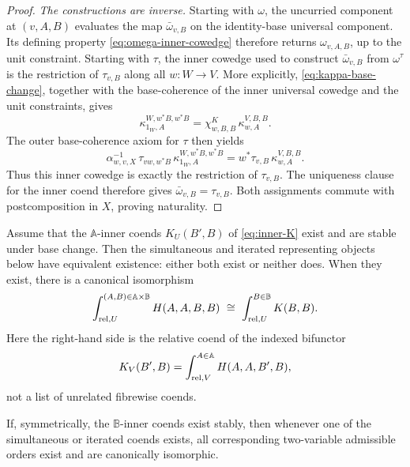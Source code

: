 \begin{proof}
\emph{The constructions are inverse.}
Starting with \(\omega\), the uncurried component at \((v,A,B)\) evaluates
the map \(\bar\omega_{v,B}\) on the identity-base universal component.
Its defining property \cref{eq:omega-inner-cowedge} therefore returns
\(\omega_{v,A,B}\), up to the unit constraint.  Starting with \(\tau\), the
inner cowedge used to construct \(\bar\omega_{v,B}\) from
\(\omega^\tau\) is the restriction of \(\tau_{v,B}\) along all
\(w:W\to V\).  More explicitly, \cref{eq:kappa-base-change}, together
with the base-coherence of the inner universal cowedge and the unit
constraints, gives
\begin{equation}
  \kappa^{W,w^*B,w^*B}_{1_W,A}
  =
  \chi^K_{w,B,B}\,
  \kappa^{V,B,B}_{w,A}.
  \label{eq:kappa-identity-restriction}
\end{equation}
The outer base-coherence axiom for \(\tau\) then yields
\begin{equation}
 \alpha^{-1}_{w,v,X}\,
 \tau_{vw,w^*B}\,
 \kappa^{W,w^*B,w^*B}_{1_W,A}
 =
 w^*\tau_{v,B}\,
 \kappa^{V,B,B}_{w,A}.
 \label{eq:tau-restricted-inner}
\end{equation}
Thus this inner cowedge is exactly the restriction of \(\tau_{v,B}\).
The uniqueness clause for the inner coend therefore gives
\(\bar\omega_{v,B}=\tau_{v,B}\).  Both assignments commute with
postcomposition in \(X\), proving naturality.
\end{proof}

\begin{theorem}
\label{thm:relative-fubini}
Assume that the \(\mathbb A\)-inner coends
\(K_U(B',B)\) of \cref{eq:inner-K} exist and are stable under base change.
Then the simultaneous and iterated representing objects below have
equivalent existence: either both exist or neither does.  When they exist,
there is a canonical isomorphism
\begin{equation}
  \mathop{\int^{(A,B)\in\mathbb A\times\mathbb B}_{\Rel,U}}
     H(A,A,B,B)
  \ \cong\ 
  \mathop{\int^{B\in\mathbb B}_{\Rel,U}}K(B,B).
  \label{eq:relative-fubini}
\end{equation}
Here the right-hand side is the relative coend of the indexed bifunctor
\[
  K_V(B',B)
  =
  \mathop{\int^{A\in\mathbb A}_{\mathrm{rel},V}}H(A,A,B',B),
\]
not a list of unrelated fibrewise coends.

If, symmetrically, the \(\mathbb B\)-inner coends exist stably, then whenever
one of the simultaneous or iterated coends exists, all corresponding
two-variable admissible orders exist and are canonically isomorphic.
\end{theorem}

